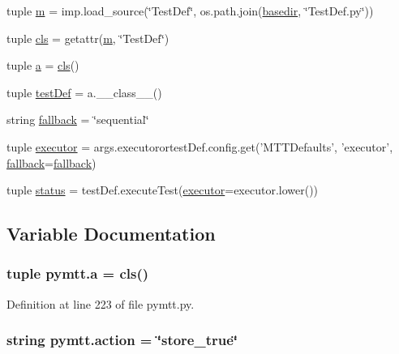 \begin{DoxyCompactItemize}
\item 
tuple \hyperlink{namespacepymtt_ab13a60c31fa69917ce06c1a2631aaf02}{m} = imp.\-load\-\_\-source(\char`\"{}Test\-Def\char`\"{}, os.\-path.\-join(\hyperlink{namespacepymtt_a57729393cfbd99464570d7fa5ad9fa05}{basedir}, \char`\"{}Test\-Def.\-py\char`\"{}))
\item 
tuple \hyperlink{namespacepymtt_a17f658b5d141d51664bb3ede8830c4c0}{cls} = getattr(\hyperlink{namespacepymtt_ab13a60c31fa69917ce06c1a2631aaf02}{m}, \char`\"{}Test\-Def\char`\"{})
\item 
tuple \hyperlink{namespacepymtt_a55825c16c4bd231f7ffbd0fe52407e3f}{a} = \hyperlink{namespacepymtt_a17f658b5d141d51664bb3ede8830c4c0}{cls}()
\item 
tuple \hyperlink{namespacepymtt_afebe539e6104da8ebd3d06b7a0e77fe7}{test\-Def} = a.\-\_\-\-\_\-class\-\_\-\-\_\-()
\item 
string \hyperlink{namespacepymtt_a5d5ee597f85e5c40ec6a923a4398c291}{fallback} = \char`\"{}sequential\char`\"{}
\item 
tuple \hyperlink{namespacepymtt_a283715e769294f7b1362c85498cdf2a3}{executor} = args.\-executorortest\-Def.\-config.\-get('M\-T\-T\-Defaults', 'executor', \hyperlink{namespacepymtt_a5d5ee597f85e5c40ec6a923a4398c291}{fallback}=\hyperlink{namespacepymtt_a5d5ee597f85e5c40ec6a923a4398c291}{fallback})
\item 
tuple \hyperlink{namespacepymtt_a1a2fd13626c1c2d248cedc138e8660ec}{status} = test\-Def.\-execute\-Test(\hyperlink{namespacepymtt_a283715e769294f7b1362c85498cdf2a3}{executor}=executor.\-lower())
\end{DoxyCompactItemize}


\subsection{Variable Documentation}
\hypertarget{namespacepymtt_a55825c16c4bd231f7ffbd0fe52407e3f}{
\subsubsection[{a}]{\setlength{\rightskip}{0pt plus 5cm}tuple pymtt.\-a = {\bf cls}()}}\label{namespacepymtt_a55825c16c4bd231f7ffbd0fe52407e3f}


Definition at line 223 of file pymtt.\-py.

\hypertarget{namespacepymtt_a5ee564a034624d925bb8dc823d11c522}{
\subsubsection[{action}]{\setlength{\rightskip}{0pt plus 5cm}string pymtt.\-action = \char`\"{}store\-\_\-true\char`\"{}}}\label{namespacepymtt_a5ee564a034624d925bb8dc823d11c522}


